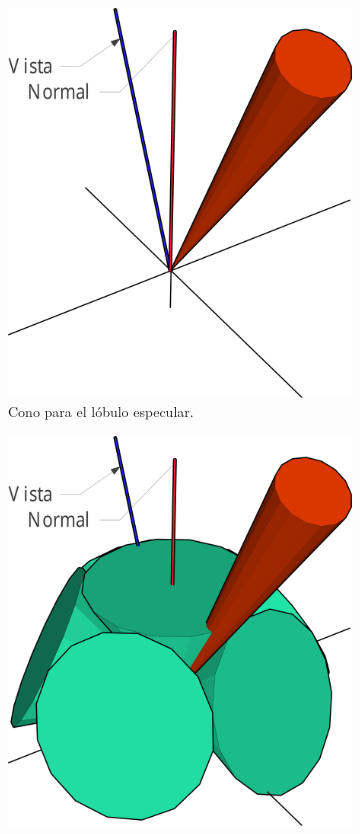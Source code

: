 \begin{figure}[H]
\begin{subfigure}[t]{.32\linewidth}
		\includegraphics[width=\linewidth]{media/specular_cone_cropped.pdf}
		\caption*{Cono para el lóbulo especular.}
	\end{subfigure}%
	\hspace{0.01\textwidth}
	\begin{subfigure}[t]{.32\linewidth}
		\centering
		\captionsetup{justification=centering}
		\includegraphics[width=\linewidth]{media/brdf_cones_cropped.pdf}

\end{subfigure}
\end{figure}
